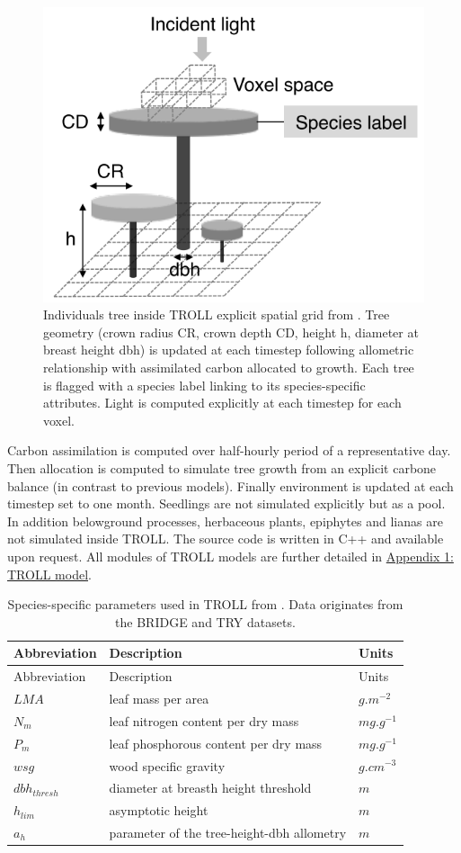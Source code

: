 \documentclass[12pt,]{article}
\theoremstyle{definition}
\theoremstyle{definition}
\theoremstyle{remark}
\begin{document}
\begin{figure}[htbp]
\centering
\includegraphics{images/TROLLtree.png}
\caption{\label{fig:TROLLtree}Individuals tree inside TROLL explicit spatial
grid from \citet{Li}. Tree geometry (crown radius CR, crown depth CD,
height h, diameter at breast height dbh) is updated at each timestep
following allometric relationship with assimilated carbon allocated to
growth. Each tree is flagged with a species label linking to its
species-specific attributes. Light is computed explicitly at each
timestep for each voxel.}
\end{figure}

Carbon assimilation is computed over half-hourly period of a
representative day. Then allocation is computed to simulate tree growth
from an explicit carbone balance (in contrast to previous models).
Finally environment is updated at each timestep set to one month.
Seedlings are not simulated explicitly but as a pool. In addition
belowground processes, herbaceous plants, epiphytes and lianas are not
simulated inside TROLL. The source code is written in C++ and available
upon request. All modules of TROLL models are further detailed in
\protect\hyperlink{appendix-1-troll-model}{Appendix 1: TROLL model}.

\begin{longtable}[]{@{}lll@{}}
\caption{\label{tab:traits}Species-specific parameters used in TROLL from
\citet{Li}. Data originates from the BRIDGE \citep{Baraloto2010} and TRY
\citep{Kattge2011} datasets.}\tabularnewline
\toprule
Abbreviation & Description & Units\tabularnewline
\midrule
\endfirsthead
\toprule
Abbreviation & Description & Units\tabularnewline
\midrule
\endhead
\(LMA\) & leaf mass per area & \(g.m^{-2}\)\tabularnewline
\(N_m\) & leaf nitrogen content per dry mass &
\(mg.g^{-1}\)\tabularnewline
\(P_m\) & leaf phosphorous content per dry mass &
\(mg.g^{-1}\)\tabularnewline
\(wsg\) & wood specific gravity & \(g.cm^{-3}\)\tabularnewline
\(dbh_{thresh}\) & diameter at breasth height threshold &
\(m\)\tabularnewline
\(h_{lim}\) & asymptotic height & \(m\)\tabularnewline
\(a_h\) & parameter of the tree-height-dbh allometry &
\(m\)\tabularnewline
\bottomrule
\end{longtable}
\end{document}
